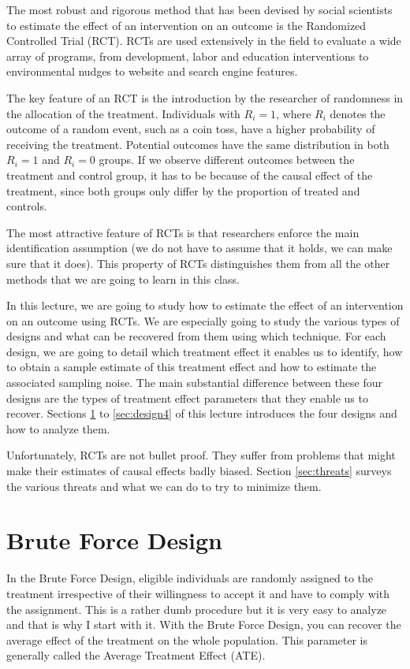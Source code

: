 \documentclass[]{book}
\theoremstyle{definition}
\theoremstyle{definition}
\theoremstyle{definition}
\theoremstyle{remark}
\begin{document}
The most robust and rigorous method that has been devised by social
scientists to estimate the effect of an intervention on an outcome is
the Randomized Controlled Trial (RCT). RCTs are used extensively in the
field to evaluate a wide array of programs, from development, labor and
education interventions to environmental nudges to website and search
engine features.

The key feature of an RCT is the introduction by the researcher of
randomness in the allocation of the treatment. Individuals with
\(R_i=1\), where \(R_i\) denotes the outcome of a random event, such as
a coin toss, have a higher probability of receiving the treatment.
Potential outcomes have the same distribution in both \(R_i=1\) and
\(R_i=0\) groups. If we observe different outcomes between the treatment
and control group, it has to be because of the causal effect of the
treatment, since both groups only differ by the proportion of treated
and controls.

The most attractive feature of RCTs is that researchers enforce the main
identification assumption (we do not have to assume that it holds, we
can make sure that it does). This property of RCTs distinguishes them
from all the other methods that we are going to learn in this class.

In this lecture, we are going to study how to estimate the effect of an
intervention on an outcome using RCTs. We are especially going to study
the various types of designs and what can be recovered from them using
which technique. For each design, we are going to detail which treatment
effect it enables us to identify, how to obtain a sample estimate of
this treatment effect and how to estimate the associated sampling noise.
The main substantial difference between these four designs are the types
of treatment effect parameters that they enable us to recover. Sections
\ref{sec:design1} to \ref{sec:design4} of this lecture introduces the
four designs and how to analyze them.

Unfortunately, RCTs are not bullet proof. They suffer from problems that
might make their estimates of causal effects badly biased. Section
\ref{sec:threats} surveys the various threats and what we can do to try
to minimize them.

\section{Brute Force Design}\label{sec:design1}

In the Brute Force Design, eligible individuals are randomly assigned to
the treatment irrespective of their willingness to accept it and have to
comply with the assignment. This is a rather dumb procedure but it is
very easy to analyze and that is why I start with it. With the Brute
Force Design, you can recover the average effect of the treatment on the
whole population. This parameter is generally called the Average
Treatment Effect (ATE).
\end{document}
